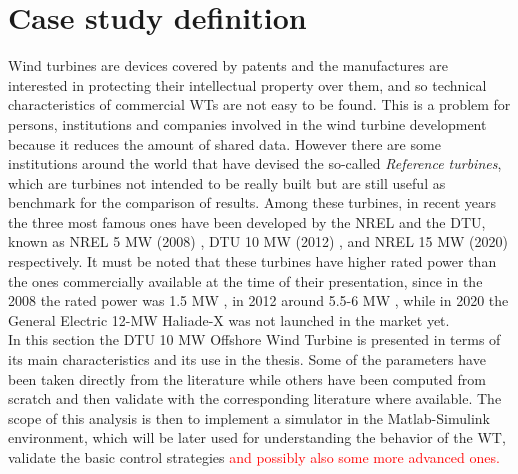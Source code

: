 \newpage
\section{Case study definition}\label{sec:c_10MW_OWT}
Wind turbines are devices covered by patents and the manufactures are interested in protecting their intellectual property over them, and so technical characteristics of commercial \acrshort{WTs} are not easy to be found. This is a problem for persons, institutions and companies involved in the wind turbine development because it reduces the amount of shared data. However there are some institutions around the world that have devised the so-called \textit{Reference turbines}, which are turbines not intended to be really built but are still useful as benchmark for the comparison of results. Among these turbines, in recent years the three most famous ones have been developed by the \acrfull{NREL} and the \acrfull{DTU}, known as NREL 5 MW (2008) \cite{NREL_5MW_reference}, DTU 10 MW (2012) \cite{DTU_Wind_Energy_Report-I-0092}, and NREL 15 MW (2020) \cite{NREL_15MW} respectively. It must be noted that these turbines have higher rated power than the ones commercially available at the time of their presentation, since in the 2008 the rated power was 1.5 MW \cite{Wind_Energy_Technology_Current_Status_and_RD_Futur}, in 2012 around 5.5-6 MW \cite{European_offshore_statistics_2012}, while in 2020 the General Electric 12-MW Haliade-X was not launched in the market yet. \\
In this section the DTU 10 MW Offshore Wind Turbine is presented in terms of its main characteristics and its use in the thesis. Some of the parameters have been taken directly from the literature while others have been computed from scratch and then validate with the corresponding literature where available. The scope of this analysis is then to implement a simulator in the Matlab-Simulink environment, which will be later used for understanding the behavior of the WT, validate the basic control strategies \textcolor{red}{and possibly also some more advanced ones.}  


